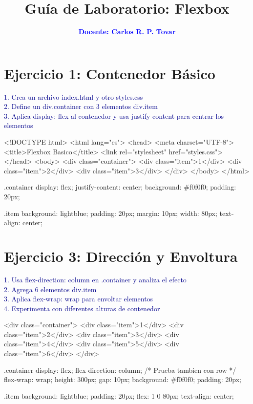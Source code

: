 \documentclass[12pt, a4paper]{article}
\title{\textbf{Guía de Laboratorio: Flexbox }}
\author{\textcolor{blue}{\textbf{Docente: Carlos R. P. Tovar}}}
\date{}
\newcommand{\enunciado}[1]{
    \vspace{0.5em}
    \noindent\colorbox{blue!10}{
        \parbox{\dimexpr\textwidth-2\fboxsep}{
            \small\sffamily\textcolor{darkblue}{#1}
        }
    }
    \vspace{0.5em}
}
\begin{document}
\maketitle

\section*{Ejercicio 1: Contenedor Básico}
\enunciado{
    1. Crea un archivo index.html y otro styles.css \\
    2. Define un div.container con 3 elementos div.item \\
    3. Aplica display: flex al contenedor y usa justify-content para centrar los elementos
}

\begin{codebox}[title=HTML]
<!DOCTYPE html>
<html lang="es">
<head>
  <meta charset="UTF-8">
  <title>Flexbox Basico</title>
  <link rel="stylesheet" href="styles.css">
</head>
<body>
  <div class="container">
    <div class="item">1</div>
    <div class="item">2</div>
    <div class="item">3</div>
  </div>
</body>
</html>
\end{codebox}

\begin{codebox}[title=CSS]
.container {
  display: flex;
  justify-content: center;
  background: #f0f0f0;
  padding: 20px;
}

.item {
  background: lightblue;
  padding: 20px;
  margin: 10px;
  width: 80px;
  text-align: center;
}
\end{codebox}

\section*{Ejercicio 3: Dirección y Envoltura}
\enunciado{
    1. Usa flex-direction: column en .container y analiza el efecto \\
    2. Agrega 6 elementos div.item \\
    3. Aplica flex-wrap: wrap para envoltar elementos \\
    4. Experimenta con diferentes alturas de contenedor
}

\begin{codebox}[title=HTML]
<div class="container">
    <div class="item">1</div>
    <div class="item">2</div>
    <div class="item">3</div>
    <div class="item">4</div>
    <div class="item">5</div>
    <div class="item">6</div>
</div>
\end{codebox}

\begin{codebox}[title=CSS]
.container {
    display: flex;
    flex-direction: column;  /* Prueba tambien con row */
    flex-wrap: wrap;
    height: 300px;
    gap: 10px;
    background: #f0f0f0;
    padding: 20px;
}

.item {
    background: lightblue;
    padding: 20px;
    flex: 1 0 80px;
    text-align: center;
}
\end{codebox}
\end{document}

